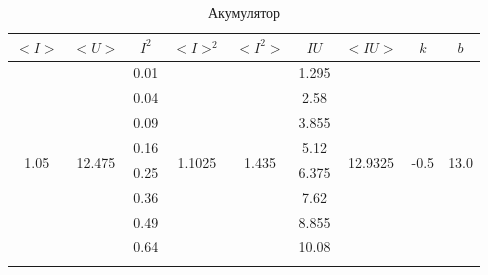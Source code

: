 \documentclass[a4paper,12pt]{article}
\begin{document}
	
	
	\newpage
	\begin{table}[h]
		\centering
		\caption{Акумулятор}
		\begin{tabular}{|c|c|c|c|c|c|c|c|c|}
			\hline
			\textbf{$<I>$}         & \textbf{$<U>$}           & \textbf{$I^2$} & \textbf{$<I>^2$}         & \textbf{$<I^2>$}        & \textbf{$IU$} & \textbf{$<IU>$}           & \textbf{$k$}           & \textbf{$b$}           \\ \hline
			\multirow{20}{*}{1.05} & \multirow{20}{*}{12.475} & 0.01           & \multirow{20}{*}{1.1025} & \multirow{20}{*}{1.435} & 1.295         & \multirow{20}{*}{12.9325} & \multirow{20}{*}{-0.5} & \multirow{20}{*}{13.0} \\ \cline{3-3} \cline{6-6}
			&                          & 0.04           &                          &                         & 2.58          &                           &                        &                        \\ \cline{3-3} \cline{6-6}
			&                          & 0.09           &                          &                         & 3.855         &                           &                        &                        \\ \cline{3-3} \cline{6-6}
			&                          & 0.16           &                          &                         & 5.12          &                           &                        &                        \\ \cline{3-3} \cline{6-6}
			&                          & 0.25           &                          &                         & 6.375         &                           &                        &                        \\ \cline{3-3} \cline{6-6}
			&                          & 0.36           &                          &                         & 7.62          &                           &                        &                        \\ \cline{3-3} \cline{6-6}
			&                          & 0.49           &                          &                         & 8.855         &                           &                        &                        \\ \cline{3-3} \cline{6-6}
			&                          & 0.64           &                          &                         & 10.08         &                           &                        &                        \\ \cline{3-3} \cline{6-6}

\end{tabular}
\end{table}
\end{document}
